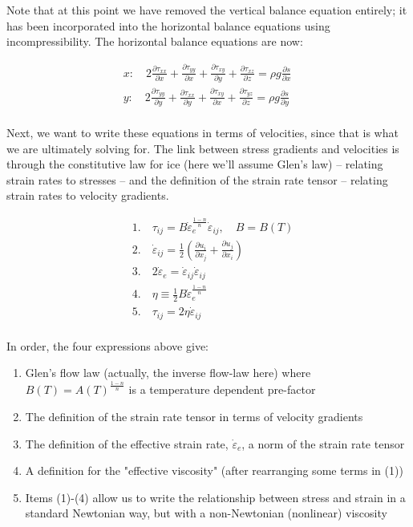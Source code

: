 Note that at this point we have removed the vertical balance equation entirely; it has been incorporated into the horizontal balance equations using incompressibility. The horizontal balance equations are now: 

\begin{align*}
  & x:\quad 2\frac{\partial \tau _{xx}}{\partial x}+\frac{\partial \tau _{yy}}{\partial x}+\frac{\partial \tau _{xy}}{\partial y}+\frac{\partial \tau _{xz}}{\partial z}=\rho g\frac{\partial s}{\partial x}\quad  \\ 
 & y:\quad 2\frac{\partial \tau _{yy}}{\partial y}+\frac{\partial \tau _{xx}}{\partial y}+\frac{\partial \tau _{xy}}{\partial x}+\frac{\partial \tau _{yz}}{\partial z}=\rho g\frac{\partial s}{\partial y} \\ 
\end{align*}

Next, we want to write these equations in terms of velocities, since that is what we are ultimately solving for. The link between stress gradients and velocities is through the constitutive law for ice (here we'll assume Glen's law) -- relating strain rates to stresses -- and the definition of the strain rate tensor -- relating strain rates to velocity gradients.

\begin{align*}
  & 1.\quad \tau _{ij}=B\dot{\varepsilon }_{e}^{\frac{1-n}{n}}\dot{\varepsilon }_{ij},\quad B=B(T) \\ 
 & 2.\quad \dot{\varepsilon }_{ij}=\frac{1}{2}\left( \frac{\partial u_{i}}{\partial x_{j}}+\frac{\partial u_{j}}{\partial x_{i}} \right) \\ 
 & 3.\quad 2\dot{\varepsilon }_{e}=\dot{\varepsilon }_{ij}\dot{\varepsilon }_{ij} \\ 
 & 4.\quad \eta \equiv \frac{1}{2}B\dot{\varepsilon }_{e}^{\frac{1-n}{n}} \\ 
 & 5.\quad \tau _{ij}=2\eta \dot{\varepsilon }_{ij} \\ 
\end{align*}

In order, the four expressions above give: 

\begin{enumerate}
\item  Glen's flow law (actually, the inverse flow-law here) where $B(T) = A(T)^{\frac{1-n}{n}}$ is a temperature dependent pre-factor
\item  The definition of the strain rate tensor in terms of velocity gradients
\item  The definition of the effective strain rate, $\dot{\varepsilon }_{e}$, a norm of the strain rate tensor
\item  A definition for the "effective viscosity" (after rearranging some terms in (1))
\item  Items (1)-(4) allow us to write the relationship between stress and strain in a standard Newtonian way, but with a non-Newtonian (nonlinear) viscosity
\end{enumerate}

